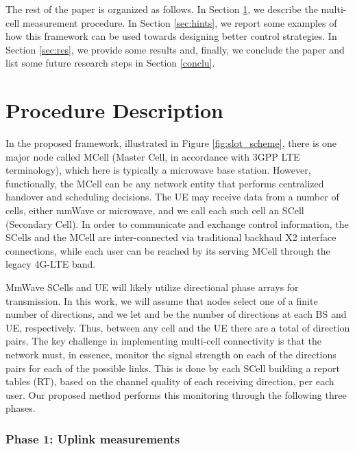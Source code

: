 \documentclass[conference,a4paper]{IEEEtran}
\begin{document}
The rest of the paper is organized as follows. In Section \ref{sec:MCP}, we describe the multi-cell measurement procedure. In Section \ref{sec:hints}, we report some examples of how this framework can be used towards designing better control strategies. In Section \ref{sec:res}, we provide some results and, finally,  we conclude the paper and list some future research steps in Section \ref{conclu}.










\section{Procedure Description}
\label{sec:MCP}



In the proposed framework, illustrated in Figure \ref{fig:slot_scheme}, there is one major node called MCell (Master Cell, in accordance with  3GPP LTE terminology), which here is typically
a microwave base station. However, functionally, the MCell can be any network entity
that performs centralized handover and scheduling decisions.  
The UE may receive data from a number of cells, either mmWave or microwave,
 and we call each such cell an SCell (Secondary Cell).
In order to communicate and exchange control information, the SCells and the MCell are inter-connected via traditional backhaul X2 interface connections, while each user can be reached by its serving MCell through the legacy 4G-LTE band.

MmWave SCells and UE will likely utilize directional phase arrays for transmission.
In this work, we will assume that nodes select one of a finite number of directions, 
and we let  and  be the number of directions at each BS 
and UE, respectively.  Thus, between any cell and the UE there are a total of 
 direction pairs.  The key challenge in implementing 
multi-cell connectivity is that the network must, in essence, monitor the signal strength 
on each of the directions pairs for each of the possible links. This is done by each SCell  building a report tables (RT), based on the channel quality of each receiving direction, per each user.  Our proposed method
performs this monitoring through the following three phases.









\subsubsection{Phase 1:  Uplink measurements}
\end{document}
